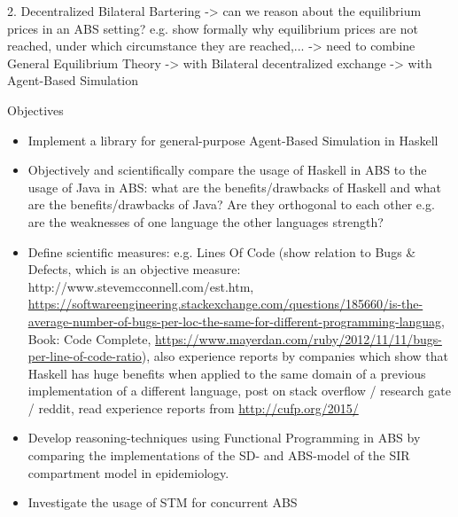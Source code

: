 	2. Decentralized Bilateral Bartering
		-> can we reason about the equilibrium prices in an ABS setting? e.g. show formally why equilibrium prices are not reached, under which circumstance they are reached,...
			-> need to combine General Equilibrium Theory
			-> with Bilateral decentralized exchange
			-> with Agent-Based Simulation 
			

Objectives
\begin{itemize}
	\item Implement a library for general-purpose Agent-Based Simulation in Haskell 
	\item Objectively and scientifically compare the usage of Haskell in ABS to the usage of Java in ABS: what are the benefits/drawbacks of Haskell and what are the benefits/drawbacks of Java? Are they orthogonal to each other e.g. are the weaknesses of one language the other languages strength?
	\item Define scientific measures: e.g. Lines Of Code (show relation to Bugs \& Defects, which is an objective measure: http://www.stevemcconnell.com/est.htm, \url{https://softwareengineering.stackexchange.com/questions/185660/is-the-average-number-of-bugs-per-loc-the-same-for-different-programming-languag}, Book: Code Complete, \url{https://www.mayerdan.com/ruby/2012/11/11/bugs-per-line-of-code-ratio}), also experience reports by companies which show that Haskell has huge benefits when applied to the same domain of a previous implementation of a different language, post on stack overflow / research gate / reddit, read experience reports from \url{http://cufp.org/2015/}
	\item Develop reasoning-techniques using Functional Programming in ABS by comparing the implementations of the SD- and ABS-model of the SIR compartment model in epidemiology.
	\item Investigate the usage of STM for concurrent ABS
\end{itemize}

